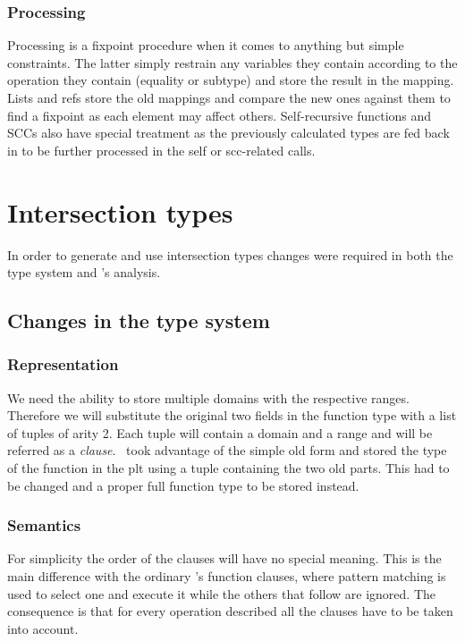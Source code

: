 \subsubsection{Processing}
\label{sct:orig_processing}

Processing is a fixpoint procedure when it comes to anything but
simple constraints. The latter simply restrain any variables they
contain according to the operation they contain (equality or subtype)
and store the result in the mapping. Lists and refs store the old
mappings and compare the new ones against them to find a fixpoint as
each element may affect others. Self-recursive functions and SCCs also
have special treatment as the previously calculated types are fed back
in to be further processed in the self or scc-related calls.

\section{Intersection types}
\label{sct:intersection_types}

In order to generate and use intersection types changes were required
in both the type system and \dr's analysis.

\subsection{Changes in the type system}
\label{sct:intersection_type_system}

\subsubsection{Representation}
\label{sct:intersection_representation}

We need the ability to store multiple domains with the respective
ranges. Therefore we will substitute the original two fields in the
function type with a list of tuples of arity 2. Each tuple will
contain a domain and a range and will be referred as a \emph{clause}.
\dr\ took advantage of the simple old form and stored the type of the
function in the plt using a tuple containing the two old parts. This
had to be changed and a proper full function type to be stored
instead.

\subsubsection{Semantics}
\label{sct:intersection_semantics}

For simplicity the order of the clauses will have no special
meaning. This is the main difference with the ordinary \er's function
clauses, where pattern matching is used to select one and execute it
while the others that follow are ignored. The consequence is that for
every operation described all the clauses have to be taken into
account.

